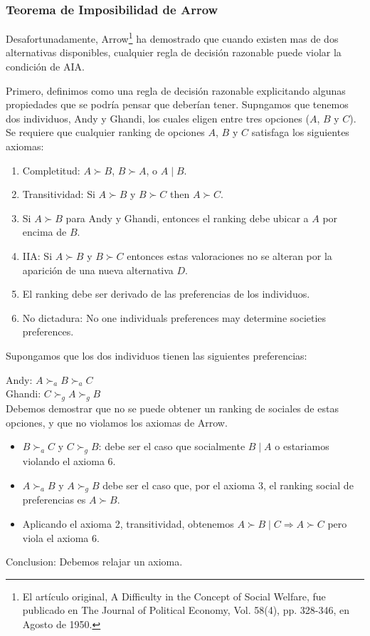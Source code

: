  \subsubsection{Teorema de Imposibilidad de Arrow}
 
 Desafortunadamente, Arrow\footnote{El artículo original, A Difficulty in the Concept of Social Welfare, fue publicado en The Journal of Political Economy, Vol. 58(4), pp. 328-346, en Agosto de 1950.} ha demostrado que cuando existen mas de dos alternativas disponibles, cualquier regla de decisión razonable puede violar la condición de AIA. 
 
 Primero, definimos como una regla de decisión razonable explicitando algunas propiedades que se podría pensar que deberían tener. Supngamos que tenemos dos individuos, Andy y Ghandi, los cuales eligen entre tres opciones ($A$, $B$ y $C$). Se requiere que cualquier ranking de opciones $A$, $B$ y $C$ satisfaga los siguientes axiomas:
 \begin{enumerate}
 \item Completitud: $A \succ B$, $B \succ A$, o $A \mid B$.
 \item Transitividad: Si $A \succ B$ y $B \succ C$ then $A \succ C$.
 \item Si $A \succ B$ para Andy y Ghandi, entonces el ranking debe ubicar a $A$ por encima de $B$.
 \item IIA: Si $A \succ B$ y $B \succ C$ entonces estas valoraciones no se alteran por la aparición de una nueva alternativa $D$.
 \item El ranking debe ser derivado de las preferencias de los individuos.
 \item No dictadura: No one individuals preferences may determine societies preferences.
\end{enumerate}
 
 Supongamos que los dos individuos tienen las siguientes preferencias:
 
 Andy: $A \succ _a B \succ _a C$ \\
 
 Ghandi: $C \succ _g A \succ _g B$ \\
 
 Debemos demostrar que no se puede obtener un ranking de sociales de estas opciones, y que no violamos los axiomas de Arrow.
\begin{itemize}
 \item $B \succ _a C$ y $C \succ _g B$: debe ser el caso que socialmente $B \mid A$ o estariamos violando el axioma 6.
 \item $A \succ _a B$ y $A \succ _g B$ debe ser el caso que, por el axioma 3, el ranking social de preferencias es $A \succ B$.
 \item Aplicando el axioma 2, transitividad, obtenemos  $A \succ B \mid C \Rightarrow A \succ C$ pero viola el axioma 6.
\end{itemize}
 Conclusion: Debemos relajar un axioma.
 
